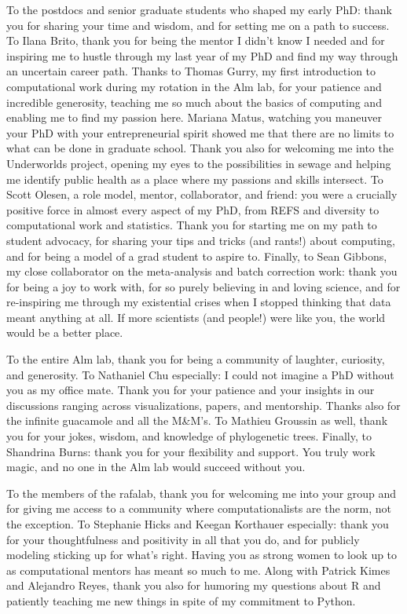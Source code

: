 To the postdocs and senior graduate students who shaped my early PhD: thank you for sharing your time and wisdom, and for setting me on a path to success.
To Ilana Brito, thank you for being the mentor I didn't know I needed and for inspiring me to hustle through my last year of my PhD and find my way through an uncertain career path.
Thanks to Thomas Gurry, my first introduction to computational work during my rotation in the Alm lab, for your patience and incredible generosity, teaching me so much about the basics of computing and enabling me to find my passion here.
Mariana Matus, watching you maneuver your PhD with your entrepreneurial spirit showed me that there are no limits to what can be done in graduate school.
Thank you also for welcoming me into the Underworlds project, opening my eyes to the possibilities in sewage and helping me identify public health as a place where my passions and skills intersect.
To Scott Olesen, a role model, mentor, collaborator, and friend: you were a crucially positive force in almost every aspect of my PhD, from REFS and diversity to computational work and statistics.
Thank you for starting me on my path to student advocacy, for sharing your tips and tricks (and rants!) about computing, and for being a model of a grad student to aspire to.
Finally, to Sean Gibbons, my close collaborator on the meta-analysis and batch correction work: thank you for being a joy to work with, for so purely believing in and loving science, and for re-inspiring me through my existential crises when I stopped thinking that data meant anything at all.
If more scientists (and people!) were like you, the world would be a better place.

To the entire Alm lab, thank you for being a community of laughter, curiosity, and generosity.
To Nathaniel Chu especially: I could not imagine a PhD without you as my office mate.
Thank you for your patience and your insights in our discussions ranging across visualizations, papers, and mentorship.
Thanks also for the infinite guacamole and all the M&M's.
To Mathieu Groussin as well, thank you for your jokes, wisdom, and knowledge of phylogenetic trees.
Finally, to Shandrina Burns: thank you for your flexibility and support.
You truly work magic, and no one in the Alm lab would succeed without you.

To the members of the rafalab, thank you for welcoming me into your group and for giving me access to a community where computationalists are the norm, not the exception.
To Stephanie Hicks and Keegan Korthauer especially: thank you for your thoughtfulness and positivity in all that you do, and for publicly modeling sticking up for what's right.
Having you as strong women to look up to as computational mentors has meant so much to me.
Along with Patrick Kimes and Alejandro Reyes, thank you also for humoring my questions about R and patiently teaching me new things in spite of my commitment to Python.

